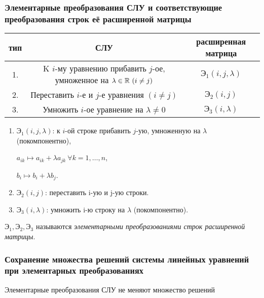 \subsubsection{Элементарные преобразования СЛУ и соответствующие преобразования строк её расширенной матрицы}

\begin{tabular}{c|c|c}
    тип & СЛУ & расширенная матрица \\
    \hline
    1. & K $i$-му уравнению прибавить $j$-ое, умноженное на $\lambda \in \mathbb{R} \ (i \neq j)$ & $\text{Э}_1(i, j, \lambda)$ \\
    2. & Переставить $i$-е и $j$-е уравнения $(i \neq j)$ & $\text{Э}_2(i, j)$ \\
    3. & Умножить $i$-ое уравнение на $\lambda \neq 0$ & $\text{Э}_3(i, \lambda)$
\end{tabular}

\begin{enumerate}
\item
    $\text{Э}_1(i, j, \lambda)$: к $i$-ой строке прибавить $j$-ую, умноженную на $\lambda$ (покомпонентно), 

    $a_{ik} \mapsto a_{ik} + \lambda a_{jk} \ \forall k = 1, \dots, n$,
    
    $b_i \mapsto b_i + \lambda b_j$.
    
\item
    $\text{Э}_2(i, j)$: переставить i-ую и j-ую строки.

\item
    $\text{Э}_3(i, \lambda)$: умножить i-ю строку на $\lambda$ (покомпонентно).
\end{enumerate}

$\text{Э}_1, \text{Э}_2, \text{Э}_3$ называются \textit{элементарными преобразованиями строк расширенной матрицы}.


\subsubsection{Сохранение множества решений системы линейных уравнений при элементарных преобразованиях}
\begin{lemma}
    Элементарные преобразования СЛУ не меняют множество решений
\end{lemma}

